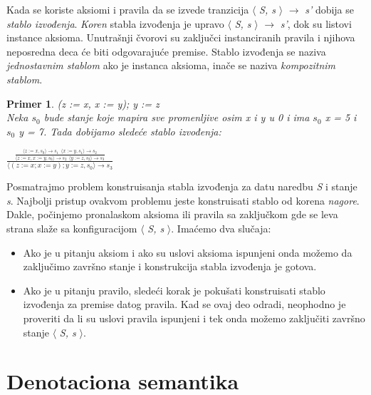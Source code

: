 \documentclass[a4paper]{article}
\newtheorem{primer}{Primer}[section]
\begin{document}
{Kada se koriste aksiomi i pravila da se izvede tranzicija $\langle$ \textit{S, s} $\rangle$ $\rightarrow$ \textit{s'} dobija se \textit{stablo izvođenja}. \textit{Koren} stabla izvođenja je upravo $\langle$ \textit{S, s} $\rangle$ $\rightarrow$ \textit{s'}, dok su listovi instance aksioma. Unutrašnji čvorovi su zaključci instanciranih pravila i njihova neposredna deca će biti odgovarajuće premise. Stablo izvođenja se naziva \textit{jednostavnim stablom} ako je instanca aksioma, inače se naziva \textit{kompozitnim stablom}.\\

\begin{primer}
(z := x, x := y); y := z \\
Neka $s_0$ bude stanje koje mapira sve promenljive osim x i y u 0 i ima $s_0$ x = 5 i $s_0$ y = 7. Tada dobijamo sledeće stablo izvođenja:

\begin{center}$\frac{\frac{\langle z := x, s_0 \rangle \rightarrow s_1\ \ \langle x := y, s_1 \rangle \rightarrow s_2}{\langle z := x, x := y, s_0\rangle \rightarrow s_2\ \ \langle y := z, s_2 \rangle \rightarrow s_3}}{\langle (z := x; x := y); y := z, s_0 \rangle \rightarrow s_3}$ \end{center}

\end{primer}

Posmatrajmo problem konstruisanja stabla izvođenja za datu naredbu \textit{S} i stanje \textit{s}. Najbolji pristup ovakvom problemu jeste konstruisati stablo od korena \textit{nagore}. Dakle, počinjemo pronalaskom aksioma ili pravila sa zaključkom gde se leva strana slaže sa konfiguracijom $\langle$ \textit{S, s} $\rangle$. Imaćemo dva slučaja:
\begin{itemize}
	\item Ako je u pitanju aksiom i ako su uslovi aksioma ispunjeni onda možemo da zaključimo završno stanje i konstrukcija stabla izvođenja je gotova.
	\item Ako je u pitanju pravilo, sledeći korak je pokušati konstruisati stablo izvođenja za premise datog pravila. Kad se ovaj deo odradi, neophodno je proveriti da li su uslovi pravila ispunjeni i tek onda možemo zaključiti završno stanje  $\langle$ \textit{S, s} $\rangle$.
\end{itemize}

\section{Denotaciona semantika}
\label{sec:densem}

}
\end{document}
